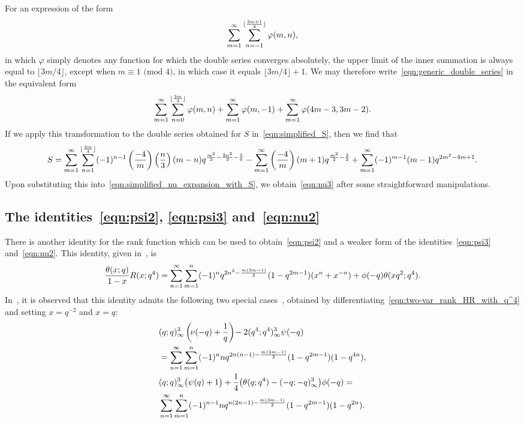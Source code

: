 \documentclass[11pt,reqno]{amsart}
\renewcommand{\=}{\;=\;}
\theoremstyle{myremark}
\begin{document}
For an expression of the form
\begin{equation} \label{eqn:generic_double_series}
\sum_{m=1}^\infty \sum_{n=-1}^{\lfloor{3m+1 \over 4}\rfloor} \varphi(m,n),
\end{equation}
in which $\varphi$ simply denotes any function for which the double series converges absolutely, the upper limit of the inner summation is always equal to $\lfloor 3m/4 \rfloor$, except when $m \equiv 1 \text{ (mod $4$)}$, in which case it equals $\lfloor 3m/4 \rfloor + 1$. We may therefore write~\eqref{eqn:generic_double_series} in the equivalent form
\[ \sum_{m=1}^\infty \sum_{n=0}^{\lfloor{3m \over 4}\rfloor} \varphi(m,n) + \sum_{m=1}^\infty \varphi(m,-1) + \sum_{m=1}^\infty \varphi(4m-3,3m-2). \]
If we apply this transformation to the double series obtained for $S$ in~\eqref{eqn:simplified_S}, then we find that
{\fontsize{9.5}{11}\selectfont
\[ S = \sum_{m=1}^\infty \sum_{n=1}^{\lfloor{3m \over 4}\rfloor} (-1)^{n-1} \left( {-4 \over m} \right) \left( {n \over 3} \right) (m-n) q^{{m^2 \over 2} - {2n^2 \over 3} - {5 \over 6}} - \sum_{m=1}^\infty \left( {-4 \over m} \right) (m+1) q^{{m^2 \over 2} - {3 \over 2}} + \sum_{m=1}^\infty (-1)^{m-1} (m-1) q^{2m^2-4m+1}. \]}
Upon substituting this into~\eqref{eqn:simplified_nu_expansion_with_S}, we obtain~\eqref{eqn:nu3} after some straightforward manipulations.

\subsection{The identities~\eqref{eqn:psi2}, \eqref{eqn:psi3} and~\eqref{eqn:nu2}}

There is another identity for the rank function which can be used to obtain~\eqref{eqn:psi2} and a weaker form of the identities~\eqref{eqn:psi3} and~\eqref{eqn:nu2}. This identity, given in~\cite[Theorem~2.1]{Bradley-Thrush2024}, is
\begin{equation} \label{eqn:two-var_rank_HR_with_q^4}
{\theta(x;q) \over 1-x} R(x;q^4) = \sum_{n=1}^{\infty} \sum_{m=1}^{n} (-1)^n q^{2n^2-{m(3m-1) \over 2}} (1-q^{2m-1})(x^n+x^{-n})
+ \phi(-q) \theta(xq^2;q^4).
\end{equation}
In~\cite[p.~1956]{Bradley-Thrush2024}, it is observed that this identity admits the following two special cases~\cite[Equations~1.5 and~1.6]{Bradley-Thrush2024}, obtained by differentiating~\eqref{eqn:two-var_rank_HR_with_q^4} and setting $x=q^{-2}$ and $x=q$:
\begin{align}
&(q;q)_\infty^3 \left( \! \nu(-q) + {1 \over q} \right) \! - 2(q^4;q^4)_\infty^3 \psi(-q) \nonumber \\
&= \sum_{n=1}^{\infty} \sum_{m=1}^n (-1)^n n q^{2n(n-1)-{m(3m-1) \over 2}} (1-q^{2m-1})(1 - q^{4n}), \label{eqn:nu_and_psi} \\
&(q;q)_\infty^3 \big( \psi(q)+1 \big) + {1 \over 4} \big( \theta(q;q^4)-(-q;-q)_\infty^3 \big) \phi(-q) = \nonumber \\
&\sum_{n=1}^\infty \sum_{m=1}^n (-1)^{n-1} n q^{n(2n-1) - {m(3m-1) \over 2}} (1-q^{2m-1})(1-q^{2n}). \label{eqn:psi_and_phi}
\end{align}
\end{document}
